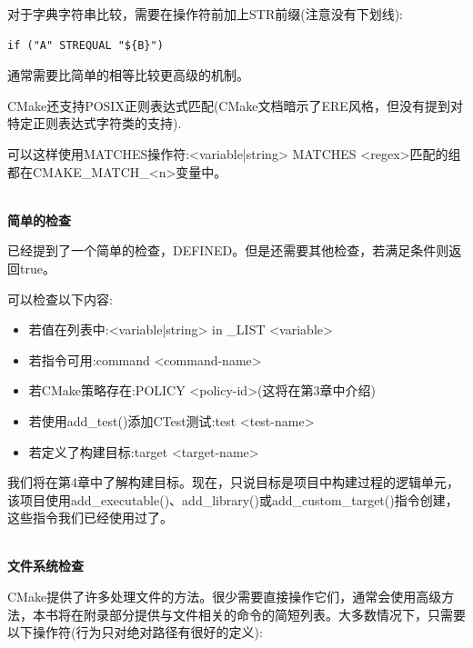 对于字典字符串比较，需要在操作符前加上STR前缀(注意没有下划线):

\begin{lstlisting}[style=styleCMake]
if ("A" STREQUAL "${B}")
\end{lstlisting}

通常需要比简单的相等比较更高级的机制。

CMake还支持POSIX正则表达式匹配(CMake文档暗示了ERE风格，但没有提到对特定正则表达式字符类的支持).

可以这样使用MATCHES操作符:<variable|string> MATCHES <regex>匹配的组都在CMAKE\_MATCH\_<n>变量中。

\hspace*{\fill} \\ %
\noindent
\textbf{简单的检查}

已经提到了一个简单的检查，DEFINED。但是还需要其他检查，若满足条件则返回true。

可以检查以下内容:

\begin{itemize}
\item 
若值在列表中:<variable|string> in \_LIST <variable>

\item 
若指令可用:command <command-name>

\item 
若CMake策略存在:POLICY <policy-id>(这将在第3章中介绍)

\item 
若使用add\_test()添加CTest测试:test <test-name>

\item 
若定义了构建目标:target <target-name>
\end{itemize}

我们将在第4章中了解构建目标。现在，只说目标是项目中构建过程的逻辑单元，该项目使用add\_executable()、add\_library()或add\_custom\_target()指令创建，这些指令我们已经使用过了。

\hspace*{\fill} \\ %
\noindent
\textbf{文件系统检查}

CMake提供了许多处理文件的方法。很少需要直接操作它们，通常会使用高级方法，本书将在附录部分提供与文件相关的命令的简短列表。大多数情况下，只需要以下操作符(行为只对绝对路径有很好的定义):

